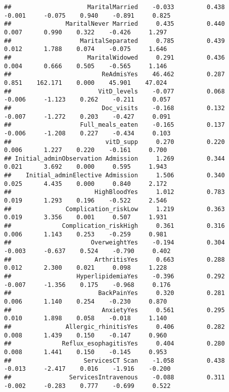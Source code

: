 \documentclass[
]{article}
\begin{document}
\begin{verbatim}
##                     MaritalMarried    -0.033         0.438       -0.001     -0.075    0.940    -0.891     0.825 
##               MaritalNever Married     0.435         0.440        0.007      0.990    0.322    -0.426     1.297 
##                   MaritalSeparated     0.785         0.439        0.012      1.788    0.074    -0.075     1.646 
##                     MaritalWidowed     0.291         0.436        0.004      0.666    0.505    -0.565     1.146 
##                         ReAdmisYes    46.462         0.287        0.851    162.171    0.000    45.901    47.024 
##                        VitD_levels    -0.077         0.068       -0.006     -1.123    0.262    -0.211     0.057 
##                         Doc_visits    -0.168         0.132       -0.007     -1.272    0.203    -0.427     0.091 
##                   Full_meals_eaten    -0.165         0.137       -0.006     -1.208    0.227    -0.434     0.103 
##                          vitD_supp     0.270         0.220        0.006      1.227    0.220    -0.161     0.700 
## Initial_adminObservation Admission     1.269         0.344        0.021      3.692    0.000     0.595     1.943 
##    Initial_adminElective Admission     1.506         0.340        0.025      4.435    0.000     0.840     2.172 
##                       HighBloodYes     1.012         0.783        0.019      1.293    0.196    -0.522     2.546 
##               Complication_riskLow     1.219         0.363        0.019      3.356    0.001     0.507     1.931 
##              Complication_riskHigh     0.361         0.316        0.006      1.143    0.253    -0.259     0.981 
##                      OverweightYes    -0.194         0.304       -0.003     -0.637    0.524    -0.790     0.402 
##                       ArthritisYes     0.663         0.288        0.012      2.300    0.021     0.098     1.228 
##                  HyperlipidemiaYes    -0.396         0.292       -0.007     -1.356    0.175    -0.968     0.176 
##                        BackPainYes     0.320         0.281        0.006      1.140    0.254    -0.230     0.870 
##                         AnxietyYes     0.561         0.295        0.010      1.898    0.058    -0.018     1.140 
##               Allergic_rhinitisYes     0.406         0.282        0.008      1.439    0.150    -0.147     0.960 
##              Reflux_esophagitisYes     0.404         0.280        0.008      1.441    0.150    -0.145     0.953 
##                    ServicesCT Scan    -1.058         0.438       -0.013     -2.417    0.016    -1.916    -0.200 
##                ServicesIntravenous    -0.088         0.311       -0.002     -0.283    0.777    -0.699     0.522 

\end{verbatim}
\end{document}
